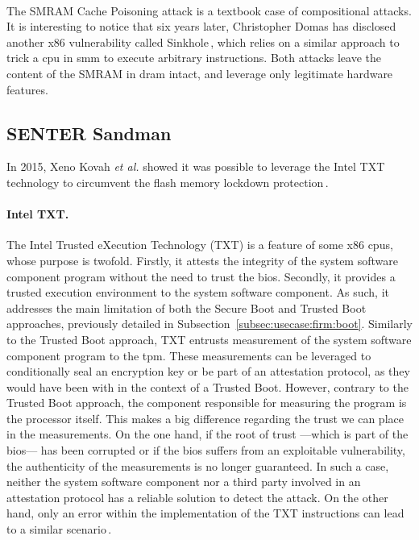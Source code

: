 \paragraph{}
%
The SMRAM Cache Poisoning attack is a textbook case of compositional attacks.
%
It is interesting to notice that six years later, Christopher Domas has
disclosed another x86 vulnerability called Sinkhole\,\cite{domas2015sinkhole},
which relies on a similar approach to trick a \ac{cpu} in \ac{smm} to execute
arbitrary instructions.
%
Both attacks leave the content of the SMRAM in \ac{dram} intact, and leverage
only legitimate hardware features.

\subsection{SENTER Sandman}
\label{subsec:usecase:hse:sandman}

In 2015, Xeno Kovah \emph{et al.} showed it was possible to leverage the Intel
TXT technology to circumvent the flash memory lockdown
protection\,\cite{kovah2015senter}.

\paragraph{Intel TXT.}
%
The Intel Trusted eXecution Technology (TXT)\cite{intel2015txt} is a feature of
some x86 \acp{cpu}, whose purpose is twofold.
%
Firstly, it attests the integrity of the system software component program
without the need to trust the \ac{bios}.
%
Secondly, it provides a trusted execution environment to the system software
component.
%
As such, it addresses the main limitation of both the Secure Boot and Trusted
Boot approaches, previously detailed in
Subsection~\ref{subsec:usecase:firm:boot}.
%
Similarly to the Trusted Boot approach, TXT entrusts measurement of the system
software component program to the \ac{tpm}.
%
These measurements can be leveraged to conditionally seal an encryption key or
be part of an attestation protocol, as they would have been with in the context
of a Trusted Boot.
%
However, contrary to the Trusted Boot approach, the component responsible for
measuring the program is the processor itself.
%
This makes a big difference regarding the trust we can place in the
measurements.
%
On the one hand, if the root of trust ---which is part of the \ac{bios}--- has
been corrupted or if the \ac{bios} suffers from an exploitable vulnerability,
the authenticity of the measurements is no longer guaranteed.
%
In such a case, neither the system software component nor a third party involved
in an attestation protocol has a reliable solution to detect the attack.
%
On the other hand, only an error within the implementation of the TXT
instructions can lead to a similar scenario\,\cite{wojtczuk2011txtbug}.

